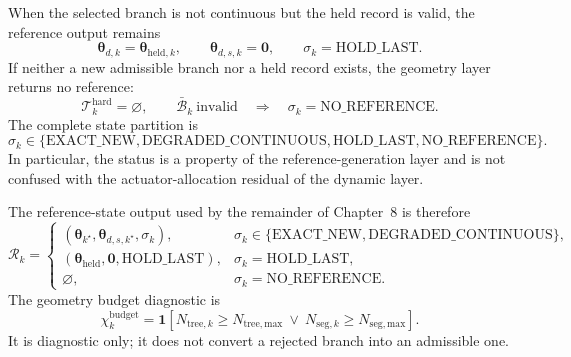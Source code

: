 \documentclass[12pt,a4paper]{report}
\begin{document}
When the selected branch is not continuous but the held record is valid, the
reference output remains
\begin{equation}
\boldsymbol{\theta}_{d,k}
=\boldsymbol{\theta}_{\mathrm{held},k},\qquad
\boldsymbol{\theta}_{d,s,k}=\mathbf{0},
\qquad
\sigma_k=\mathrm{HOLD\_LAST}.
\tag{8.141}
\label{eq:ch8-hold-state}
\end{equation}
If neither a new admissible branch nor a held record exists, the geometry
layer returns no reference:
\begin{equation}
\mathcal{T}_k^{\mathrm{hard}}=\varnothing,\qquad
\bar{\mathcal{B}}_k\ \text{invalid}
\quad\Longrightarrow\quad
\sigma_k=\mathrm{NO\_REFERENCE}.
\tag{8.142}
\label{eq:ch8-no-reference}
\end{equation}
The complete state partition is
\begin{equation}
\sigma_k\in
\{\mathrm{EXACT\_NEW},\mathrm{DEGRADED\_CONTINUOUS},
\mathrm{HOLD\_LAST},\mathrm{NO\_REFERENCE}\}.
\tag{8.143}
\label{eq:ch8-state-partition}
\end{equation}
In particular, the status is a property of the reference-generation layer
and is not confused with the actuator-allocation residual of the dynamic
layer.

The reference-state output used by the remainder of Chapter~8 is therefore
\begin{equation}
\mathcal{R}_k=
\begin{cases}
(\boldsymbol{\theta}_{k^\star},
\boldsymbol{\theta}_{d,s,k^\star},\sigma_k),
&\sigma_k\in\{\mathrm{EXACT\_NEW},
\mathrm{DEGRADED\_CONTINUOUS}\},\\
(\boldsymbol{\theta}_{\mathrm{held}},\mathbf{0},\mathrm{HOLD\_LAST}),
&\sigma_k=\mathrm{HOLD\_LAST},\\
\varnothing,&\sigma_k=\mathrm{NO\_REFERENCE}.
\end{cases}
\tag{8.144}
\label{eq:ch8-reference-output}
\end{equation}
The geometry budget diagnostic is
\begin{equation}
\chi_k^{\mathrm{budget}}=
\mathbf{1}\!\left[
N_{\mathrm{tree},k}\geq N_{\mathrm{tree,max}}
\ \lor\
N_{\mathrm{seg},k}\geq N_{\mathrm{seg,max}}
\right].
\tag{8.145}
\label{eq:ch8-budget-diagnostic}
\end{equation}
It is diagnostic only; it does not convert a rejected branch into an
admissible one.
\end{document}
